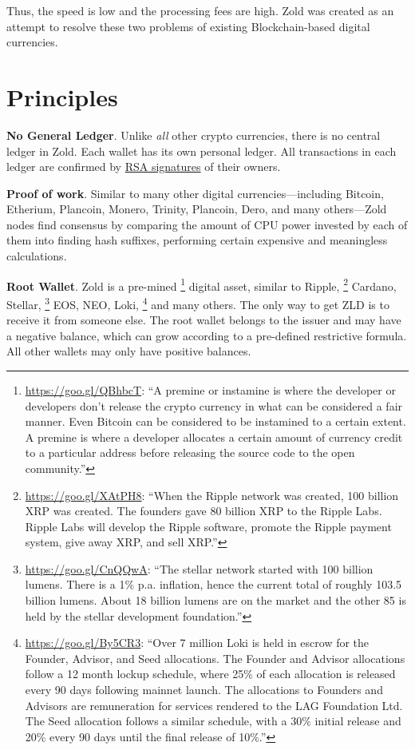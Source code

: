 \documentclass[11pt,oneside]{article}
\begin{document}
Thus, the speed is low and the processing fees are high.
Zold was created as an attempt to resolve these two problems
of existing Blockchain-based digital currencies.

\section{Principles}

\textbf{No General Ledger}.
Unlike \emph{all} other crypto currencies, there is no central ledger in Zold.
Each wallet has its own personal ledger.
All transactions in each ledger are confirmed by
\href{https://en.wikipedia.org/wiki/RSA_(cryptosystem)}{RSA signatures} of their owners.

\textbf{Proof of work}.
Similar to many other digital currencies---including Bitcoin, Etherium, Plancoin, Monero, Trinity, Plancoin, Dero,
and many others---Zold nodes find consensus by comparing the amount of CPU power invested
by each of them into finding hash suffixes, performing certain expensive and meaningless calculations.

\textbf{Root Wallet}.
Zold is a pre-mined%
\footnote{%
  \url{https://goo.gl/QBhbcT}:
  ``A premine or instamine is where the developer or developers don't release
  the crypto currency in what can be considered a fair manner.
  Even Bitcoin can be considered to be instamined to a certain extent.
  A premine is where a developer allocates a certain amount of currency
  credit to a particular address before releasing the source
  code to the open community.''
}
digital asset, similar to Ripple,%
\footnote{%
  \url{https://goo.gl/XAtPH8}:
  ``When the Ripple network was created, 100 billion XRP was created.
  The founders gave 80 billion XRP to the Ripple Labs. Ripple Labs
  will develop the Ripple software, promote the Ripple payment system,
  give away XRP, and sell XRP.''
}
Cardano,
Stellar,%
\footnote{%
  \url{https://goo.gl/CnQQwA}:
  ``The stellar network started with 100 billion lumens.
  There is a 1\% p.a. inflation, hence the current total of roughly 103.5 billion lumens.
  About 18 billion lumens are on the market and the other
  85 is held by the stellar development foundation.''
}
EOS, NEO, Loki,%
\footnote{%
  \url{https://goo.gl/By5CR3}:
  ``Over 7 million Loki is held in escrow for the Founder,
  Advisor, and Seed allocations. The Founder and Advisor allocations
  follow a 12 month lockup schedule, where 25\% of each allocation is
  released every 90 days following mainnet launch. The allocations
  to Founders and Advisors are remuneration for services rendered to the
  LAG Foundation Ltd. The Seed allocation follows a similar schedule, with a
  30\% initial release and 20\% every 90 days until the final release of 10\%.''
}
and many others.
The only way to get ZLD is to receive it from someone else.
The root wallet belongs to the issuer and may have a negative balance,
which can grow according to a pre-defined restrictive formula.
All other wallets may only have positive balances.
\end{document}
